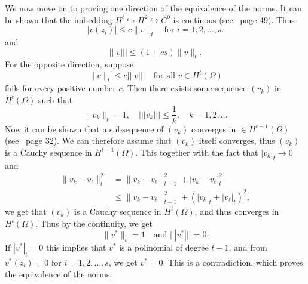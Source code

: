 \begin{bev}
We now move on to proving one direction of the equivalence of the norms. 
It can be shown that the imbedding $H^t\hookrightarrow H^2 \hookrightarrow C^0$ is continous (see~\cite{Braess} page 49). Thus
\begin{equation*}
    |v(z_i)|\leq c\|v\|_t\quad \text{for } i=1,2,\ldots,s.
\end{equation*} 
and
\begin{equation*}
    |||v|||\leq (1+cs)\|v\|_t.
\end{equation*}
For the opposite direction, suppose 
\begin{equation*}
    \|v\|_t\leq c|||v|||\quad \text{for all } v\in H^t(\Omega)
\end{equation*}
fails for every positive number $c$. Then there exists some sequence $(v_k)$ in $H^t(\Omega)$ such that
\begin{equation*}
    \|v_k\|_t=1,\quad |||v_k|||\leq \frac{1}{k},\quad k=1,2,\ldots
\end{equation*}
Now it can be shown that a subsequence of $(v_k)$ converges in $\in H^{t-1}(\Omega)$ (see~\cite{Braess} page 32). We can therefore assume that $(v_k)$ itself converges, thus $(v_k)$ is a Cauchy sequence in $H^{t-1}(\Omega)$.
This together with the fact that $|v_k|_t\to 0$ and
\begin{align*}
    \|v_k-v_\ell\|_t^2 &= \|v_k-v_\ell\|_{t-1}^2 + |v_k-v_\ell|_t^2 \\
    & \leq\|v_k-v_\ell\|_{t-1}^2 + {(|v_k|_t + |v_\ell|_t)}^2 ,
\end{align*}
 we get that $(v_k)$ is a Cauchy sequence in $H^t(\Omega)$, and thus converges in $H^t(\Omega)$.
Thus by the continuity, we get 
\begin{equation}
    \|v^*\|_t = 1\quad \text{and }|||v^*|||=0. 
\end{equation}
If $|v^*|_t = 0$ this implies that $v^*$ is a polinomial of degree $t-1$, and from $v^*(z_i)=0$ for $i=1,2,\ldots,s$, we get $v^*=0$. 
This is a contradiction, which proves the equivalence of the norms. %
\end{bev}

